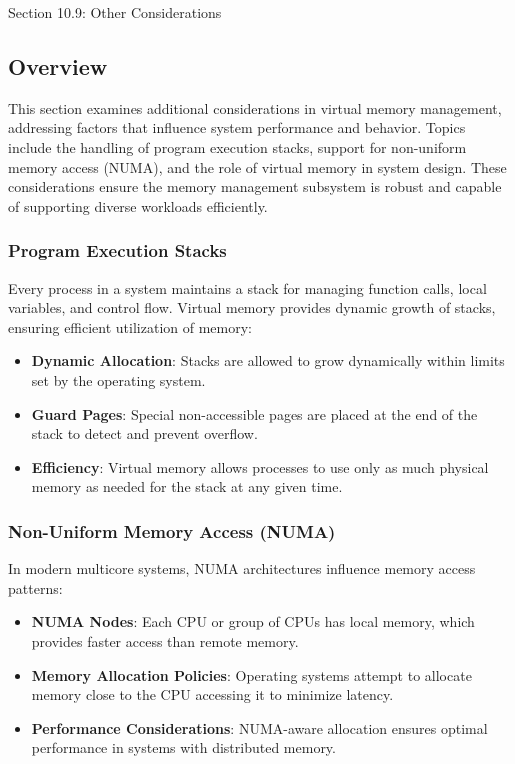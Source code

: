 \begin{notes}{Section 10.9: Other Considerations}
    \subsection*{Overview}

    This section examines additional considerations in virtual memory management, addressing factors that influence system performance and behavior. Topics include the handling of program execution 
    stacks, support for non-uniform memory access (NUMA), and the role of virtual memory in system design. These considerations ensure the memory management subsystem is robust and capable of supporting 
    diverse workloads efficiently.
    
    \subsubsection*{Program Execution Stacks}
    
    Every process in a system maintains a stack for managing function calls, local variables, and control flow. Virtual memory provides dynamic growth of stacks, ensuring efficient utilization of memory:
    \begin{itemize}
        \item \textbf{Dynamic Allocation}: Stacks are allowed to grow dynamically within limits set by the operating system.
        \item \textbf{Guard Pages}: Special non-accessible pages are placed at the end of the stack to detect and prevent overflow.
        \item \textbf{Efficiency}: Virtual memory allows processes to use only as much physical memory as needed for the stack at any given time.
    \end{itemize}
    
    \subsubsection*{Non-Uniform Memory Access (NUMA)}
    
    In modern multicore systems, NUMA architectures influence memory access patterns:
    \begin{itemize}
        \item \textbf{NUMA Nodes}: Each CPU or group of CPUs has local memory, which provides faster access than remote memory.
        \item \textbf{Memory Allocation Policies}: Operating systems attempt to allocate memory close to the CPU accessing it to minimize latency.
        \item \textbf{Performance Considerations}: NUMA-aware allocation ensures optimal performance in systems with distributed memory.
    \end{itemize}
    

\end{notes}
